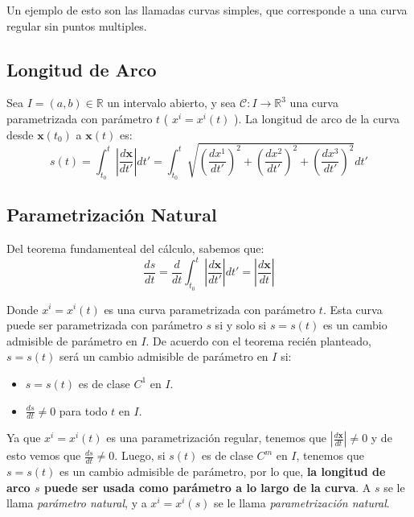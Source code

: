 \documentclass[letterpaper,11pt,twoside]{report}
\begin{document}
Un ejemplo de esto son las llamadas curvas simples, que corresponde a una curva regular sin puntos multiples.

\subsection{Longitud de Arco}

Sea $I = (a,b) \in \mathbb{R}$ un intervalo abierto, y sea $\mathcal{C}: I \longrightarrow \mathbb{R}^{3}$ una curva parametrizada con 
par\'ametro $t$ ( $x^{i} = x^{i}(t)$ ). La longitud de arco de la curva desde $\textbf{x}(t_{0})$ a $\textbf{x}(t)$ es:
	\begin{equation*}
		s(t) = \int^{t}_{t_{0}} \left| \frac{d\textbf{x}}{dt'}\right| dt' =  \int^{t}_{t_{0}} \sqrt{ \left( \frac{dx^{1}}{dt'} \right)^{2} + \left( \frac{dx^{2}}{dt'} \right)^{2} + \left( \frac{dx^{3}}{dt'} \right)^{2}} dt'
	\end{equation*}
	
\subsection{Parametrizaci\'on Natural}

Del teorema fundamenteal del c\'alculo, sabemos que:
	\begin{equation*}
		\frac{ds}{dt} = \frac{d}{dt} \int^{t}_{t_{0}} \left| \frac{d\textbf{x}}{dt'}\right| dt' = \left| \frac{d\textbf{x}}{dt}\right|
	\end{equation*}
	
Donde $x^{i} = x^{i}(t)$ es una curva parametrizada con par\'ametro $t$. Esta curva puede ser parametrizada con par\'ametro $s$ si y solo si 
$s = s(t)$ es un cambio admisible de par\'ametro en $I$. De acuerdo con el teorema reci\'en planteado, $s = s(t)$ ser\'a un cambio admisible de 
par\'ametro en $I$ si:
	\begin{itemize}
		\item	$s = s(t)$ es de clase $C^{1}$ en $I$.
		\item	$\frac{ds}{dt} \neq 0$ para todo $t$ en $I$.
	\end{itemize}

Ya que $x^{i} = x^{i}(t)$ es una parametrizaci\'on regular, tenemos que $\left| \frac{d\textbf{x}}{dt}\right| \neq 0$ y de esto vemos que 
$\frac{ds}{dt} \neq 0$. Luego, si $s(t)$ es de clase $C^{m}$ en $I$, tenemos que $s = s(t)$ es un cambio admisible de par\'ametro, por lo que, 
\textbf{la longitud de arco $s$ puede ser usada como par\'ametro a lo largo de la curva}. A $s$ se le llama \textit{par\'ametro natural}, y a 
$x^{i} = x^{i}(s)$ se le llama \textit{parametrizaci\'on natural}. \\
	
\end{document}
